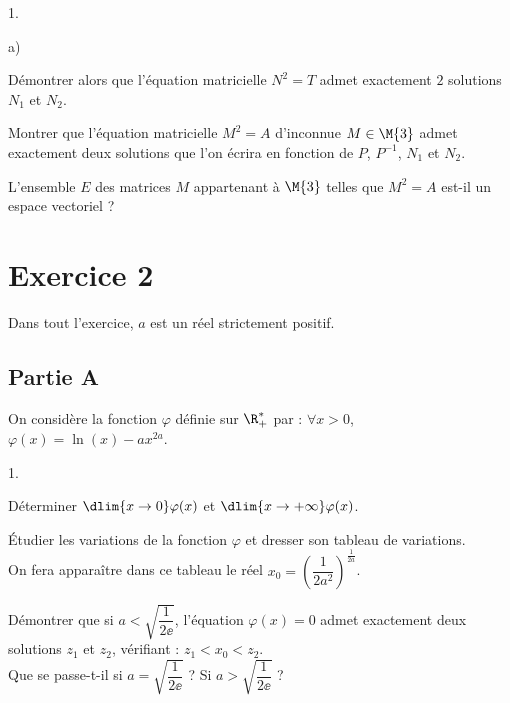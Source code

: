 \begin{noliste}{1.}
\begin{noliste}{a)}
    
    \newpage
    
    
  \item Démontrer alors que l'équation matricielle $N^2=T$ admet
    exactement $2$ solutions $N_1$ et $N_2$.
    
    
  \end{noliste}
  
\item Montrer que l'équation matricielle $M^2=A$ d'inconnue
  $M\in\M{3}$ admet exactement deux solutions que l'on écrira en
  fonction de $P$, $P^{-1}$, $N_1$ et $N_2$.

  
  
\item L'ensemble $E$ des matrices $M$ appartenant à $\M{3}$ telles que
  $M^2=A$ est-il un espace vectoriel ?

  
\end{noliste}








\section*{Exercice 2}
\noindent
Dans tout l'exercice, $a$ est un réel strictement positif.

\subsection*{Partie A}
\noindent
On considère la fonction $\varphi$ définie sur $\R_+^*$ par : $\forall 
x>0$, $\varphi(x)=\ln(x)-ax^{2a}$.
\begin{noliste}{1.}
\item Déterminer $\dlim{x\to 0} \varphi(x)$ et $\dlim{x\to+\infty}
  \varphi(x)$.

  
  
\item Étudier les variations de la fonction $\varphi$ et dresser son
  tableau de variations.\\
  On fera apparaître dans ce tableau le réel $x_0 =
  \left(\dfrac{1}{2a^2}\right)^{\frac{1}{2a}}$.

  
  
\item Démontrer que si $a<\sqrt{\dfrac{1}{2\ee}}$, l'équation
  $\varphi(x)=0$ admet exactement deux solutions $z_1$ et $z_2$,
  vérifiant : $z_1<x_0<z_2$.\\
  Que se passe-t-il si $a=\sqrt{\dfrac{1}{2\ee}}$ ? Si
  $a>\sqrt{\dfrac{1}{2\ee}}$ ?

  
\end{noliste}

